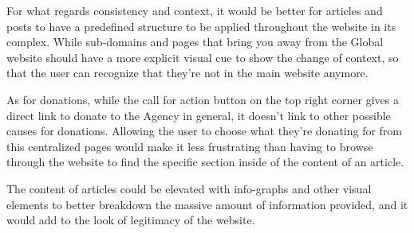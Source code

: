 For what regards consistency and context, it would be better for articles and posts to have a predefined structure to be applied throughout the website in its complex. While sub-domains and pages that bring you away from the Global website should have a more explicit visual cue to show the change of context, so that the user can recognize that they're not in the main website anymore.

As for donations, while the call for action button on the top right corner gives a direct link to donate to the Agency in general, it doesn't link to other possible causes for donations. Allowing the user to choose what they're donating for from this centralized pages would make it less frustrating than having to browse through the website to find the specific section inside of the content of an article.

The content of articles could be elevated with info-graphs and other visual elements to better breakdown the massive amount of information provided, and it would add to the look of legitimacy of the website.
